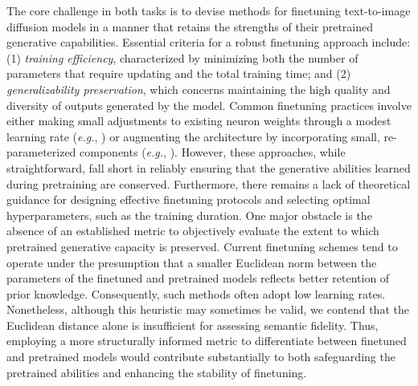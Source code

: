The core challenge in both tasks is to devise methods for finetuning text-to-image diffusion models in a manner that retains the strengths of their pretrained generative capabilities. Essential criteria for a robust finetuning approach include: (1) \emph{training efficiency}, characterized by minimizing both the number of parameters that require updating and the total training time; and (2) \emph{generalizability preservation}, which concerns maintaining the high quality and diversity of outputs generated by the model. Common finetuning practices involve either making small adjustments to existing neuron weights through a modest learning rate (\emph{e.g.}, \cite{ruiz2023dreambooth}) or augmenting the architecture by incorporating small, re-parameterized components (\emph{e.g.}, \cite{hulora2022,zhang2023adding}). However, these approaches, while straightforward, fall short in reliably ensuring that the generative abilities learned during pretraining are conserved. Furthermore, there remains a lack of theoretical guidance for designing effective finetuning protocols and selecting optimal hyperparameters, such as the training duration. One major obstacle is the absence of an established metric to objectively evaluate the extent to which pretrained generative capacity is preserved. Current finetuning schemes tend to operate under the presumption that a smaller Euclidean norm between the parameters of the finetuned and pretrained models reflects better retention of prior knowledge. Consequently, such methods often adopt low learning rates. Nonetheless, although this heuristic may sometimes be valid, we contend that the Euclidean distance alone is insufficient for assessing semantic fidelity. Thus, employing a more structurally informed metric to differentiate between finetuned and pretrained models would contribute substantially to both safeguarding the pretrained abilities and enhancing the stability of finetuning.

